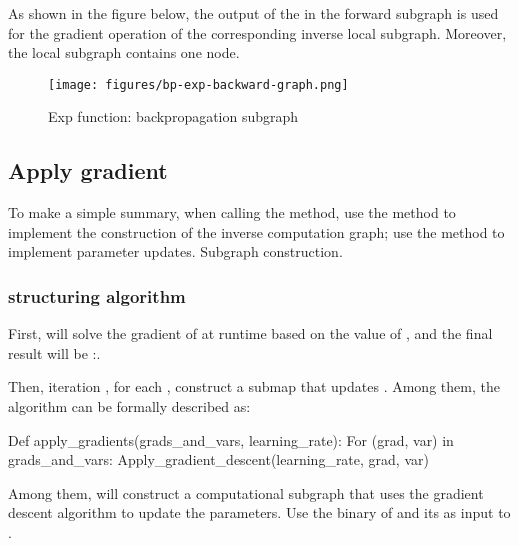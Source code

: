 \begin{content}
As shown in the figure below, the output of the  in the forward subgraph is used for the gradient operation of the corresponding inverse local subgraph. Moreover, the local subgraph contains one node.

\begin{figure}[!h]
\centering
\texttt{[image: figures/bp-exp-backward-graph.png]}
\caption{Exp function: backpropagation subgraph}
 \label{fig:bp-exp-backward-graph}
\end{figure}

\subsection{Apply gradient}

To make a simple summary, when calling the  method, use the  method to implement the construction of the inverse computation graph; use the  method to implement parameter updates. Subgraph construction.

\subsubsection{structuring algorithm}

First,  will solve the gradient of  at runtime based on the value of , and the final result will be :.

Then,  iteration , for each , construct a submap that updates . Among them, the algorithm can be formally described as:

\begin{leftbar}
\begin{python}
Def apply_gradients(grads_and_vars, learning_rate):
  For (grad, var) in grads_and_vars:
    Apply_gradient_descent(learning_rate, grad, var)
\end{python}
\end{leftbar}

Among them,  will construct a computational subgraph that uses the gradient descent algorithm to update the parameters. Use the binary of  and its  as input to .


\end{content}
